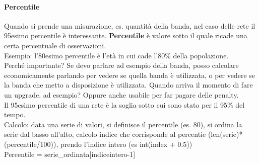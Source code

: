 \documentclass[10pt]{book}
\begin{document}
\paragraph{Percentile} Quando si prende una misurazione, es. quantità della banda, nel caso delle rete il 95esimo percentile è interessante. \textbf{Percentile} è valore sotto il quale ricade una certa percentuale di osservazioni.\\
Esempio: l'80esimo percentile è l'età in cui cade l'80\% della popolazione.\\
Perché importante? Se devo parlare ad esempio della banda, posso calcolare economicamente parlando per vedere se quella banda è utilizzata, o per vedere se la banda che metto a disposizione è utilizzata. Quando arriva il momento di fare un upgrade, ad esempio? Oppure anche usabile per far pagare delle penalty.\\
Il 95esimo percentile di una rete è la soglia sotto cui sono stato per il 95\% del tempo.\\
Calcolo: data una serie di valori, si definisce il percentile (es. 80), si ordina la serie dal basso all'alto, calcolo indice che corrisponde al percentie (len(serie)*(percentile/100)), prendo l'indice intero (es int(index + 0.5))\\
Percentile = serie\_ordinata[indiceintero-1]
\end{document}
